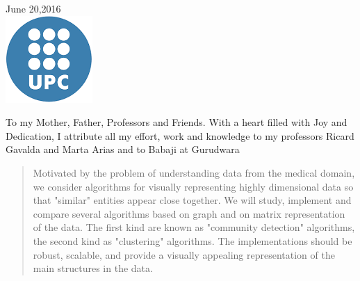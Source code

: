 \begin{titlepage}

\bigskip
\bigskip
{\large June 20,2016}\\[2cm] %


\includegraphics{logo.png}\\[1cm] %
 

\vfill %

\end{titlepage}

\newpage




\begin{dedication}
To my Mother, Father, Professors and Friends. With a heart filled with Joy and Dedication, I attribute all my effort, work and knowledge to my professors Ricard Gavalda and Marta Arias and to Babaji at Gurudwara
\end{dedication}
\newpage
\clearpage
\newpage
\newpage

\begin{abstract}
Motivated by the problem of understanding data from
the medical domain, we consider algorithms for visually representing 
highly dimensional data so that "similar" entities appear close together. We will study, 
implement and compare several algorithms based on graph and on matrix
representation of the data. The first kind are known as "community detection"
algorithms, the second kind as "clustering" algorithms. The implementations
should be robust, scalable, and provide a visually appealing representation
of the main structures in the data.

\end{abstract}

